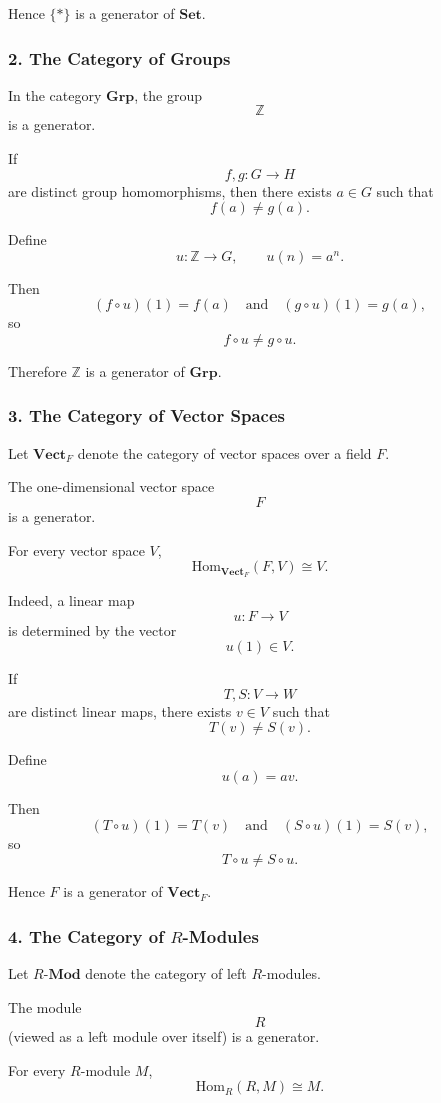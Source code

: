 Hence $\{*\}$ is a generator of $\mathbf{Set}$.

\subsubsection*{2. The Category of Groups}

In the category $\mathbf{Grp}$, the group
\[
\mathbb Z
\]
is a generator.

If
\[
f,g : G \to H
\]
are distinct group homomorphisms, then there exists
$a\in G$ such that
\[
f(a)\neq g(a).
\]

Define
\[
u:\mathbb Z \to G,
\qquad
u(n)=a^n.
\]

Then
\[
(f\circ u)(1)=f(a)
\quad\text{and}\quad
(g\circ u)(1)=g(a),
\]
so
\[
f\circ u \neq g\circ u.
\]

Therefore $\mathbb Z$ is a generator of $\mathbf{Grp}$.

\subsubsection*{3. The Category of Vector Spaces}

Let $\mathbf{Vect}_F$ denote the category of vector spaces over a field $F$.

The one-dimensional vector space
\[
F
\]
is a generator.

For every vector space $V$,
\[
\mathrm{Hom}_{\mathbf{Vect}_F}(F,V)
\cong V.
\]

Indeed, a linear map
\[
u:F\to V
\]
is determined by the vector
\[
u(1)\in V.
\]

If
\[
T,S:V\to W
\]
are distinct linear maps, there exists
$v\in V$ such that
\[
T(v)\neq S(v).
\]

Define
\[
u(a)=av.
\]

Then
\[
(T\circ u)(1)=T(v)
\quad\text{and}\quad
(S\circ u)(1)=S(v),
\]
so
\[
T\circ u \neq S\circ u.
\]

Hence $F$ is a generator of $\mathbf{Vect}_F$.

\subsubsection*{4. The Category of $R$-Modules}

Let $R\text{-}\mathbf{Mod}$ denote the category of left $R$-modules.

The module
\[
R
\]
(viewed as a left module over itself) is a generator.

For every $R$-module $M$,
\[
\mathrm{Hom}_R(R,M)
\cong M.
\]

